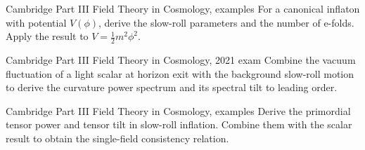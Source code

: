 \begin{exercise}{Cambridge Part III Field Theory in Cosmology, examples}
For a canonical inflaton with potential \(V(\phi)\), derive the slow-roll
parameters and the number of e-folds.  Apply the result to
\(V=\tfrac12m^2\phi^2\).
\end{exercise}

\begin{exercise}{Cambridge Part III Field Theory in Cosmology, 2021 exam}
Combine the vacuum fluctuation of a light scalar at horizon exit with the
background slow-roll motion to derive the curvature power spectrum and its
spectral tilt to leading order.
\end{exercise}

\begin{exercise}{Cambridge Part III Field Theory in Cosmology, examples}
Derive the primordial tensor power and tensor tilt in slow-roll inflation.
Combine them with the scalar result to obtain the single-field consistency
relation.
\end{exercise}
